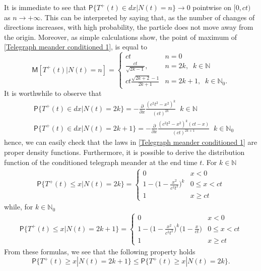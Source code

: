 \documentclass{article}
\theoremstyle{definition}
\numberwithin{equation}{section}
\begin{document}
It is immediate to see that $\mathsf{P}\{T^+(t) \in dx|N(t) = n\} \to 0$ pointwise on $[0,ct)$ as $n \to +\infty$. This can be interpreted by saying that, as the number of changes of directions increases, with high probability, the particle does not move away from the origin. Moreover, as simple calculations show, the point of maximum of \eqref{Telegraph meander conditioned 1}, is equal to
\begin{equation}\label{Mode}
\mathsf{M}[T^+(t)|N(t) = n] = 
\begin{cases}
ct &n=0\\
\frac{ct}{\sqrt{2k-1}}, &n = 2k,\;\; k \in \mathbb{N}\\
ct\frac{\sqrt{2k+2}-1}{2k+1} &n=2k+1,\;\; k \in \mathbb{N}_0. 
\end{cases}
\end{equation}
It is worthwhile to observe that
\begin{align}
&\mathsf{P}\{T^+(t) \in dx|N(t) = 2k\}= -\frac{\partial}{\partial x}\frac{(c^2t^2-x^2)^{k}}{(ct)^{2k}} \;\;k \in \mathbb{N}\label{Telegraph meander conditioned even}\\
&\mathsf{P}\{T^+(t) \in dx|N(t) = 2k+1\}=-\frac{\partial}{\partial x}\frac{(c^2t^2-x^2)^{k}(ct-x)}{(ct)^{2k+1}} \;\;k \in \mathbb{N}_0\label{Telegraph meander conditioned odd}
\end{align}
hence, we can easily check that the laws in \eqref{Telegraph meander conditioned 1} are proper density functions. Furthermore, it is possible to derive the distribution function of the conditioned telegraph meander at the end time $t$. For $k \in \mathbb{N}$
\begin{align}
\mathsf{P}\{T^+(t) \leq x|N(t) = 2k\} =\begin{cases}
0 &x< 0\\
1-\Big(1-\frac{x^2}{c^2t^2}\Big)^{k} &0\leq x<ct \\ 
1 &x \geq ct
\end{cases} 
\end{align}
while, for $k \in \mathbb{N}_0$
\begin{align}
\mathsf{P}\{T^+(t) \leq x|N(t) = 2k+1\} =\begin{cases}
0 &x< 0\\
1-\Big(1-\frac{x^2}{c^2t^2}\Big)^{k}\Big(1-\frac{x}{ct}\Big) &0\leq x<ct \\ 
1 &x \geq ct
\end{cases}
\end{align}
From these formulas, we see that the following property holds
\begin{equation}\label{stochastic dominance}
\mathsf{P}\{T^+(t) \geq x|N(t) = 2k+1\} \leq \mathsf{P}\{T^+(t) \geq x|N(t) = 2k\}.
\end{equation}
\end{document}
